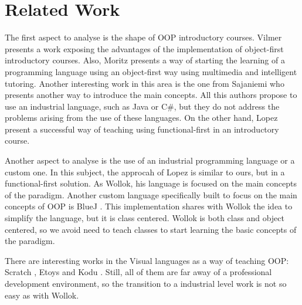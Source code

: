 \section{Related Work}
\label{sec:related}




The first aspect to analyse is the shape of OOP introductory courses.
Vilmer \etal \cite{vilner_2007} presents a work exposing the advantages of the implementation of object-first introductory courses. 
Also, Moritz \etal \cite{moritz_2005} presents a way of starting the learning of a programming language using an object-first way using multimedia and intelligent tutoring.
Another interesting work in this area is the one from Sajaniemi \etal \cite{Sajaniemi_teachingprogramming:} who presents another way to introduce the main concepts.
All this authors propose to use an industrial language, such as Java or C\#, but they do not address the problems arising from the use of these languages.
On the other hand, Lopez \etal \cite{lopez_nombre_2012} present a successful way of teaching using functional-first in an introductory course. 

Another aspect to analyse is the use of an industrial programming language or a custom one. 
In this subject, the approcah of Lopez \etal \cite{lopez_nombre_2012} is similar to ours, but in a functional-first solution. 
As Wollok, his language is focused on the main concepts of the paradigm.
Another custom language specifically built to focus on the main concepts of OOP is BlueJ \cite{bennedsen_bluej_2010}. 
This implementation shares with Wollok the idea to simplify the language, but it is class centered. 
Wollok is both class and object centered, so we avoid need to teach classes to start learning the basic concepts of the paradigm.

There are interesting works in the Visual languages as a way of teaching OOP: Scratch \cite{malan_scratch_2007}, Etoys \cite{lee_empowering_2011} and Kodu \cite{kodu}. 
Still, all of them are far away of a professional development environment, so the transition to a industrial level work is not so easy as with Wollok.
